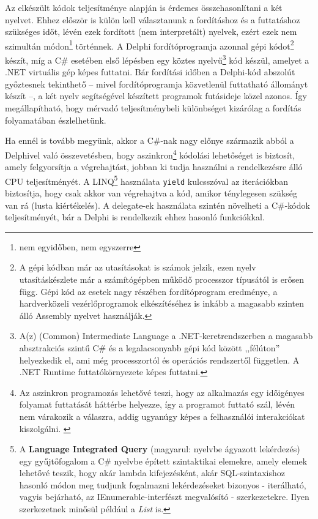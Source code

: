 \documentclass[tocnopagenum]{thesis-ekf}
\theoremstyle{definition}
\theoremstyle{remark}
\begin{document}
	Az elkészült kódok teljesítménye alapján is érdemes összehasonlítani a két nyelvet. Ehhez először is külön kell választanunk a fordításhoz és a futtatáshoz szükséges időt, lévén ezek fordított (nem interpretált) nyelvek, ezért ezek nem szimultán módon\footnote{nem egyidőben, nem egyszerre} történnek. A Delphi fordítóprogramja azonnal gépi kódot\footnote{A gépi kódban már az utasításokat is számok jelzik, ezen nyelv utasításkészlete már a számítógépben működő processzor típusától is erősen függ. Gépi kód az esetek nagy részében fordítóprogram eredménye, a hardverközeli vezérlőprogramok elkészítéséhez is inkább a magasabb szinten álló Assembly nyelvet használják.} készít, míg a C\# esetében első lépésben egy köztes nyelvű\footnote{A(z) (Common) Intermediate Language a .NET-keretrendszerben a magasabb absztrakciós szintű C\# és a legalacsonyabb gépi kód között ,,félúton'' helyezkedik el, ami még processzortól és operációs rendszertől független. A .NET Runtime futtatókörnyezete képes futtatni.} kód készül, amelyet a .NET virtuális gép képes futtatni. Bár fordítási időben a Delphi-kód abszolút győztesnek tekinthető -- mivel fordítóprogramja közvetlenül futtatható állományt készít --, a két nyelv segítségével készített programok futásideje közel azonos. Így megállapítható, hogy mérvadó teljesítménybeli különbséget kizárólag a fordítás folyamatában észlelhetünk.
	
	Ha ennél is tovább megyünk, akkor a C\#-nak nagy előnye származik abból a Delphivel való összevetésben, hogy aszinkron\footnote{ Az aszinkron programozás lehetővé teszi, hogy az alkalmazás egy időigényes folyamat futtatását háttérbe helyezze, így a programot futtató szál, lévén nem várakozik a válaszra, addig ugyanúgy képes a felhasználói interakciókat kiszolgálni. \cite{async}} kódolási lehetőséget is biztosít, amely felgyorsítja a végrehajtást, jobban ki tudja használni a rendelkezésre álló CPU teljesítményét. A LINQ\footnote{A \textbf{Language Integrated Query} (magyarul: nyelvbe ágyazott lekérdezés) egy gyűjtőfogalom a C\# nyelvbe épített szintaktikai elemekre, amely elemek lehetővé teszik, hogy akár lambda kifejezésként, akár SQL-szintaxishoz hasonló módon meg tudjunk fogalmazni lekérdezéseket bizonyos - iterálható, vagyis bejárható, az IEnumerable-interfészt megvalósító - szerkezetekre. Ilyen szerkezetnek minősül például a \textit{List} is.} használata \verb|yield| kulcsszóval az iterációkban biztosítja, hogy csak akkor van végrehajtva a kód, amikor ténylegesen szükség van rá (lusta kiértékelés). A delegate-ek használata szintén növelheti a C\#-kódok teljesítményét, bár a Delphi is rendelkezik ehhez hasonló funkciókkal.
	\cite{perf_comp}
	
\end{document}
